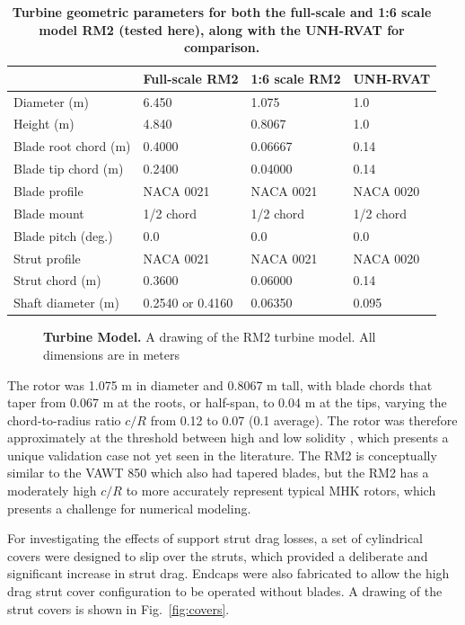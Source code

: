 \documentclass[10pt,letterpaper]{article}
\begin{document}
\begin{table}[ht]
\centering
\begin{tabular}{l|l|l|l}
   & Full-scale RM2 & 1:6 scale RM2 & UNH-RVAT \\
\hline
Diameter (m)   & 6.450 & 1.075 & 1.0 \\
Height (m)     & 4.840 & 0.8067 & 1.0 \\
Blade root chord (m) & 0.4000 & 0.06667 & 0.14 \\
Blade tip chord (m)  & 0.2400 & 0.04000 & 0.14 \\
Blade profile & NACA 0021 & NACA 0021 & NACA 0020 \\
Blade mount & 1/2 chord & 1/2 chord & 1/2 chord \\
Blade pitch (deg.) & 0.0 & 0.0 & 0.0 \\
Strut profile & NACA 0021 & NACA 0021 & NACA 0020 \\
Strut chord (m) & 0.3600 & 0.06000 & 0.14 \\
Shaft diameter (m) & 0.2540 \cite{Beam2011} or 0.4160 \cite{Hill2014} & 0.06350 & 0.095 \\
\end{tabular}
\caption{\textbf{Turbine geometric parameters for both the full-scale and 1:6
scale model RM2 (tested here), along with the UNH-RVAT for comparison.}}
\label{tab:turb-geom}
\end{table}

\begin{figure}[h]

    \caption{{\bf Turbine Model.} A drawing of the RM2 turbine model. All
    dimensions are in meters}

    \label{fig:turbine-drawing}
\end{figure}

The rotor was 1.075 m in diameter and 0.8067 m tall, with blade chords that
taper from 0.067 m at the roots, or half-span, to 0.04 m at the tips, varying
the chord-to-radius ratio $c/R$ from 0.12 to 0.07 (0.1 average). The rotor was
therefore approximately at the threshold between high and low solidity
\cite{Strickland1981,Fiedler2009}, which presents a unique validation case not
yet seen in the literature. The RM2 is conceptually similar to the VAWT 850
\cite{Mays1990} which also had tapered blades, but the RM2 has a moderately high
$c/R$ to more accurately represent typical MHK rotors, which presents a
challenge for numerical modeling.

For investigating the effects of support strut drag losses, a set of cylindrical
covers were designed to slip over the struts, which provided a deliberate and
significant increase in strut drag. Endcaps were also fabricated to allow the
high drag strut cover configuration to be operated without blades. A drawing of
the strut covers is shown in Fig.~\ref{fig:covers}.
\end{document}
